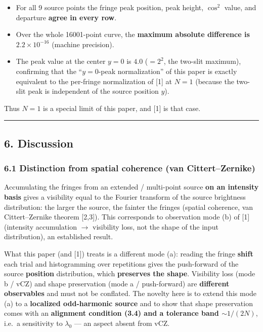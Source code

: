 \documentclass[
]{article}
\providecommand{\tightlist}{%
  \setlength{\itemsep}{0pt}\setlength{\parskip}{0pt}}
\begin{document}
\begin{itemize}
\tightlist
\item
  For all 9 source points the fringe peak position, peak height,
  \(\cos^2\) value, and departure \textbf{agree in every row}.
\item
  Over the whole 16001-point curve, the \textbf{maximum absolute
  difference is \(2.2\times10^{-16}\)} (machine precision).
\item
  The peak value at the center \(y=0\) is \(4.0\) (\(=2^2\), the
  two-slit maximum), confirming that the ``\(y=0\)-peak normalization''
  of this paper is exactly equivalent to the per-fringe normalization of
  {[}1{]} at \(N=1\) (because the two-slit peak is independent of the
  source position \(y\)).
\end{itemize}

Thus \(N=1\) is a special limit of this paper, and {[}1{]} is that case.

\begin{center}\rule{0.5\linewidth}{0.5pt}\end{center}

\subsection{6. Discussion}\label{discussion}

\subsubsection{6.1 Distinction from spatial coherence (van
Cittert--Zernike)}\label{distinction-from-spatial-coherence-van-cittertzernike}

Accumulating the fringes from an extended / multi-point source
\textbf{on an intensity basis} gives a visibility equal to the Fourier
transform of the source brightness distribution: the larger the source,
the fainter the fringes (spatial coherence, van Cittert--Zernike theorem
{[}2,3{]}). This corresponds to observation mode (b) of {[}1{]}
(intensity accumulation \(\to\) visibility loss, not the shape of the
input distribution), an established result.

What this paper (and {[}1{]}) treats is a different mode (a): reading
the fringe \textbf{shift} each trial and histogramming over repetitions
gives the push-forward of the source \textbf{position} distribution,
which \textbf{preserves the shape}. Visibility loss (mode b / vCZ) and
shape preservation (mode a / push-forward) are \textbf{different
observables} and must not be conflated. The novelty here is to extend
this mode (a) to a \textbf{localized odd-harmonic source} and to show
that shape preservation comes with an \textbf{alignment condition (3.4)
and a tolerance band \(\sim1/(2N)\)}, i.e.~a sensitivity to
\(\lambda_0\) --- an aspect absent from vCZ.
\end{document}
